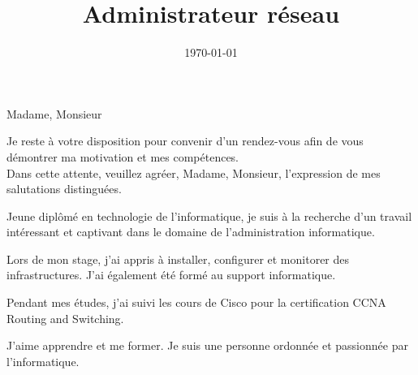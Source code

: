 \documentclass[11pt,a4paper]{moderncv}
\title{Administrateur réseau}
\begin{document}
\date{\today} %
\opening{Madame, Monsieur} %
\closing{Je reste à votre disposition pour convenir d'un rendez-vous afin de vous démontrer ma motivation et mes compétences. \\ Dans cette attente, veuillez agréer, Madame, Monsieur, l'expression de mes salutations distinguées.} %

\makelettertitle %

Jeune diplômé en technologie de l'informatique, je suis à la recherche d'un travail intéressant et captivant dans le domaine de l'administration informatique. 

Lors de mon stage, j'ai appris à installer, configurer et monitorer des infrastructures.
J'ai également été formé au support informatique. 

Pendant mes études, j'ai suivi les cours de Cisco pour la certification CCNA Routing and Switching.

J'aime apprendre et me former. Je suis une personne ordonnée et passionnée par l'informatique.       

\makeletterclosing %
\end{document}
